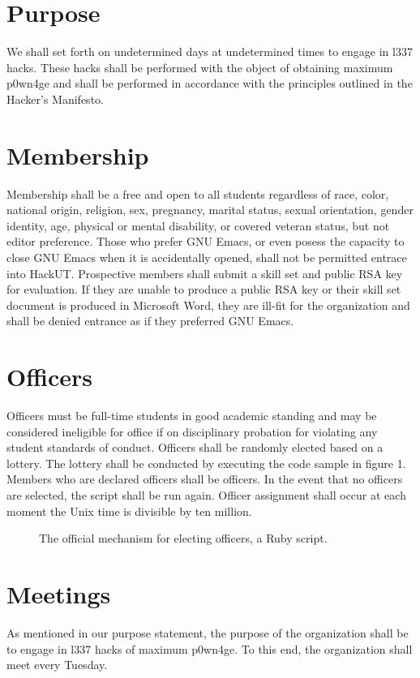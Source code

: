 \documentclass[12pt]{article}
\begin{document}
\section*{Purpose}
We shall set forth on undetermined days at undetermined times to engage in l337 hacks.  These hacks shall be performed with the object of obtaining maximum p0wn4ge and shall be performed in accordance with the principles outlined in the Hacker's Manifesto.

\section*{Membership}
Membership shall be a free and open to all students regardless of race, color, national origin, religion, sex, pregnancy, marital status, sexual orientation, gender identity, age, physical or mental disability, or covered veteran status, but not editor preference.  Those who prefer GNU Emacs, or even posess the capacity to close GNU Emacs when it is accidentally opened, shall not be permitted entrace into HackUT.  Prospective members shall submit a skill set and public RSA key for evaluation.  If they are unable to produce a public RSA key or their skill set document is produced in Microsoft Word, they are ill-fit for the organization and shall be denied entrance as if they preferred GNU Emacs.

\section*{Officers}
Officers must be full-time students in good academic standing and may be considered ineligible for office if on disciplinary probation for violating any student standards of conduct.  Officers shall be randomly elected based on a lottery.  The lottery shall be conducted by executing the code sample in figure 1.  Members who are declared officers shall be officers.  In the event that no officers are selected, the script shall be run again.  Officer assignment shall occur at each moment the Unix time is divisible by ten million.

\begin{figure}
  \caption{The official mechanism for electing officers, a Ruby script.}
  
\end{figure}

\section*{Meetings}
As mentioned in our purpose statement, the purpose of the organization shall be to engage in l337 hacks of maximum p0wn4ge.  To this end, the organization shall meet every Tuesday.
\end{document}
